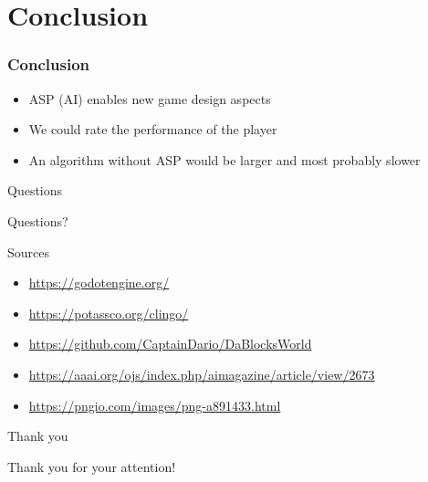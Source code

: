 \documentclass[12pt]{beamer}
\begin{document}
    \section{Conclusion}
        \begin{frame}[fragile]
            \frametitle{Conclusion}
            \begin{itemize}
                \item ASP (AI) enables new game design aspects
                \item We could rate the performance of the player
                \item An algorithm without ASP would be larger
                      and most probably slower
            \end{itemize}
        \end{frame}

    \begin{frame}[fragile]{Questions}
        \begin{center}
            Questions?  
        \end{center}
    \end{frame}

    \begin{frame}[fragile]{Sources}
        \begin{itemize}
            \item \url{https://godotengine.org/}
            \item \url{https://potassco.org/clingo/}
            \item \url{https://github.com/CaptainDario/DaBlocksWorld}
            \item \url{https://aaai.org/ojs/index.php/aimagazine/article/view/2673}
            \item \url{https://pngio.com/images/png-a891433.html}
        \end{itemize}
    \end{frame}

    \begin{frame}[fragile]{Thank you}
        \begin{center}
            Thank you for your attention!
        \end{center}
    \end{frame}
\end{document}
